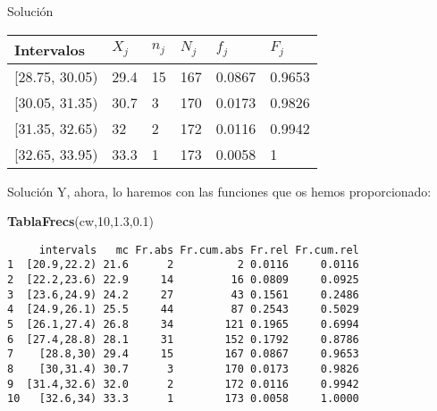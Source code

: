 \documentclass[
  ignorenonframetext,
]{beamer}
\newenvironment{Shaded}{\begin{snugshade}}{\end{snugshade}}
\newcommand{\DecValTok}[1]{\textcolor[rgb]{0.00,0.00,0.81}{#1}}
\newcommand{\FloatTok}[1]{\textcolor[rgb]{0.00,0.00,0.81}{#1}}
\newcommand{\KeywordTok}[1]{\textcolor[rgb]{0.13,0.29,0.53}{\textbf{#1}}}
\newcommand{\NormalTok}[1]{#1}
\begin{document}
\begin{frame}{Solución}
\protect\hypertarget{soluciuxf3n-12}{}
\begin{longtable}[]{@{}llllll@{}}
\toprule
Intervalos & \(X_j\) & \(n_j\) & \(N_j\) & \(f_j\) &
\(F_j\)\tabularnewline
\midrule
\endhead
{[}28.75, 30.05) & 29.4 & 15 & 167 & 0.0867 & 0.9653\tabularnewline
{[}30.05, 31.35) & 30.7 & 3 & 170 & 0.0173 & 0.9826\tabularnewline
{[}31.35, 32.65) & 32 & 2 & 172 & 0.0116 & 0.9942\tabularnewline
{[}32.65, 33.95) & 33.3 & 1 & 173 & 0.0058 & 1\tabularnewline
\bottomrule
\end{longtable}
\end{frame}

\begin{frame}[fragile]{Solución}
\protect\hypertarget{soluciuxf3n-13}{}
Y, ahora, lo haremos con las funciones que os hemos proporcionado:

\begin{Shaded}
\begin{Highlighting}[]
\KeywordTok{TablaFrecs}\NormalTok{(cw,}\DecValTok{10}\NormalTok{,}\FloatTok{1.3}\NormalTok{,}\FloatTok{0.1}\NormalTok{)}
\end{Highlighting}
\end{Shaded}

\begin{verbatim}
     intervals   mc Fr.abs Fr.cum.abs Fr.rel Fr.cum.rel
1  [20.9,22.2) 21.6      2          2 0.0116     0.0116
2  [22.2,23.6) 22.9     14         16 0.0809     0.0925
3  [23.6,24.9) 24.2     27         43 0.1561     0.2486
4  [24.9,26.1) 25.5     44         87 0.2543     0.5029
5  [26.1,27.4) 26.8     34        121 0.1965     0.6994
6  [27.4,28.8) 28.1     31        152 0.1792     0.8786
7    [28.8,30) 29.4     15        167 0.0867     0.9653
8    [30,31.4) 30.7      3        170 0.0173     0.9826
9  [31.4,32.6) 32.0      2        172 0.0116     0.9942
10   [32.6,34) 33.3      1        173 0.0058     1.0000
\end{verbatim}
\end{frame}
\end{document}
